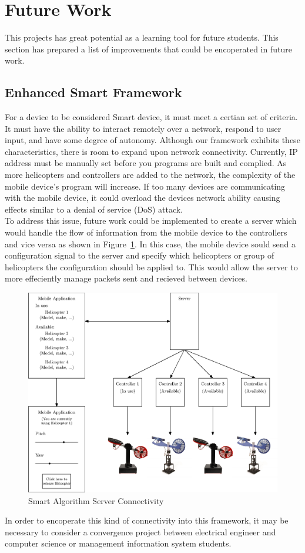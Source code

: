 \section{Future Work}
This projects has great potential as a learning tool for future students.  This section has prepared a list of improvements that could be encoperated in future work.

\subsection{Enhanced Smart Framework}
For a device to be considered Smart device, it must meet a certian set of criteria.  It must have the ability to interact remotely over a network, respond to user input, and have some degree of autonomy.  Although our framework exhibits these characteristics, there is room to expand upon network connectivity.  Currently, IP address must be manually set before you programs are built and complied.  As more helicopters and controllers are added to the network, the complexity of the mobile device's program will increase.  If too many devices are communicating with the mobile device, it could overload the devices network ability causing effects similar to a denial of service (DoS) attack.\\
To address this issue, future work could be implemented to create a server which would handle the flow of information from the mobile device to the controllers and vice versa as shown in Figure~\ref{fig:Smart_Alg}.  In this case, the mobile device sould send a configuration signal to the server and specify which helicopters or group of helicopters the configuration should be applied to.  This would allow the server to more effeciently manage packets sent and recieved between devices.\\
\begin{figure}[!htbp]
    \centering
    \includegraphics[width=.46\textwidth,keepaspectratio=true]{figs/ipe/smartAlg.eps}
    \caption{Smart Algorithm Server Connectivity}
    \label{fig:Smart_Alg}
\end{figure}
In order to encoperate this kind of connectivity into this framework, it may be necessary to consider a convergence project between electrical engineer and computer science or management information system students.


